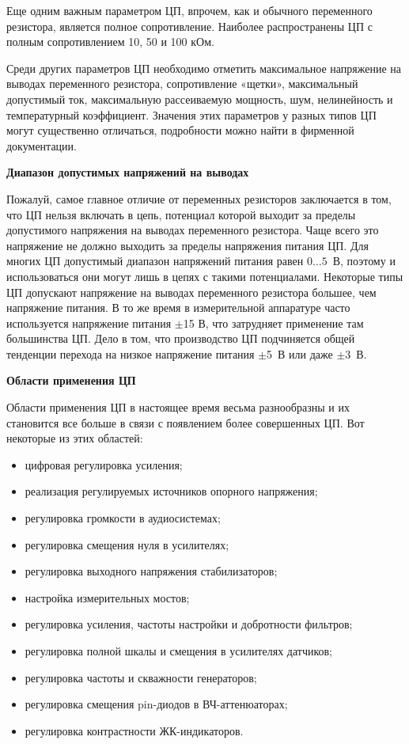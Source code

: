 Еще одним важным параметром ЦП, впрочем, как и обычного переменного резистора, является полное сопротивление. Наиболее распространены ЦП с полным сопротивлением 10, 50 и 100 кОм.

Среди других параметров ЦП необходимо отметить максимальное напряжение на выводах переменного резистора, сопротивление «щетки», максимальный допустимый ток, максимальную рассеиваемую мощность, шум, нелинейность и температурный коэффициент. Значения этих параметров у разных типов ЦП могут существенно отличаться, подробности можно найти в фирменной документации.

\begin{flushleft}
\textbf{Диапазон допустимых напряжений на выводах}
\end{flushleft}

Пожалуй, самое главное отличие от переменных резисторов заключается в том, что ЦП нельзя включать в цепь, потенциал которой выходит за пределы допустимого напряжения на выводах переменного резистора. Чаще всего это напряжение не должно выходить за пределы напряжения питания ЦП. Для многих ЦП допустимый диапазон напряжений питания равен $ 0\ldots5 $~В, поэтому и использоваться они могут лишь в цепях с такими потенциалами. Некоторые типы ЦП допускают напряжение на выводах переменного резистора большее, чем напряжение питания. В то же время в измерительной аппаратуре часто используется напряжение питания $ \pm $15 В, что затрудняет применение там большинства ЦП. Дело в том, что производство ЦП подчиняется общей тенденции перехода на низкое напряжение питания $ \pm $5~В или даже $ \pm $3~В. 

\begin{flushleft}
\textbf{Области применения ЦП}
\end{flushleft}

Области применения ЦП в настоящее время весьма разнообразны и их становится все больше в связи с появлением более совершенных ЦП. Вот некоторые из этих областей:
\begin{itemize}
\item цифровая регулировка усиления; 
\item реализация регулируемых источников опорного напряжения; 
\item регулировка громкости в аудиосистемах; 
\item регулировка смещения нуля в усилителях; 
\item регулировка выходного напряжения стабилизаторов; 
\item настройка измерительных мостов; 
\item регулировка усиления, частоты настройки и добротности фильтров; 
\item регулировка полной шкалы и смещения в усилителях датчиков; 
\item регулировка частоты и скважности генераторов; 
\item регулировка смещения pin-диодов в ВЧ-аттенюаторах; 
\item регулировка контрастности ЖК-индикаторов. 
\end{itemize}

